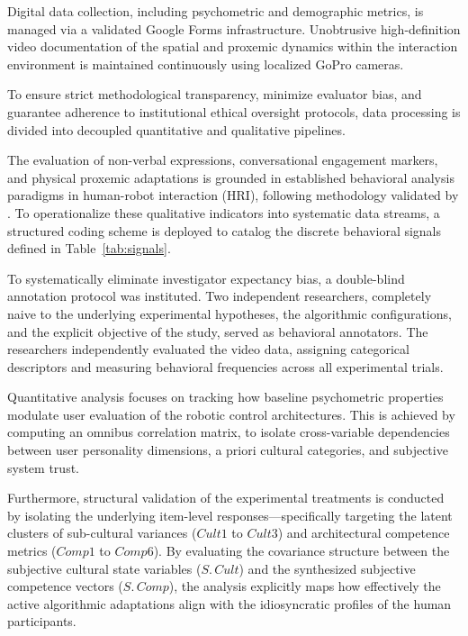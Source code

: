 Digital data collection, including psychometric and demographic metrics, is managed via a validated Google Forms infrastructure. Unobtrusive high-definition video documentation of the spatial and proxemic dynamics within the interaction environment is maintained continuously using localized GoPro cameras.

To ensure strict methodological transparency, minimize evaluator bias, and guarantee adherence to institutional ethical oversight protocols, data processing is divided into decoupled quantitative and qualitative pipelines.

The evaluation of non-verbal expressions, conversational engagement markers, and physical proxemic adaptations is grounded in established behavioral analysis paradigms in human-robot interaction (HRI), following methodology validated by \citep{9515502}. To operationalize these qualitative indicators into systematic data streams, a structured coding scheme is deployed to catalog the discrete behavioral signals defined in Table~\ref{tab:signals}.

To systematically eliminate investigator expectancy bias, a double-blind annotation protocol was instituted. Two independent researchers, completely naive to the underlying experimental hypotheses, the algorithmic configurations, and the explicit objective of the study, served as behavioral annotators. The researchers independently evaluated the video data, assigning categorical descriptors and measuring behavioral frequencies across all experimental trials. 

Quantitative analysis focuses on tracking how baseline psychometric properties modulate user evaluation of the robotic control architectures. This is achieved by computing an omnibus correlation matrix, to isolate cross-variable dependencies between user personality dimensions, a priori cultural categories, and subjective system trust. 

Furthermore, structural validation of the experimental treatments is conducted by isolating the underlying item-level responses—specifically targeting the latent clusters of sub-cultural variances ($\mathit{Cult1}$ to $\mathit{Cult3}$) and architectural competence metrics ($\mathit{Comp1}$ to $\mathit{Comp6}$). By evaluating the covariance structure between the subjective cultural state variables ($\mathit{S.\,Cult}$) and the synthesized subjective competence vectors ($\mathit{S.\,Comp}$), the analysis explicitly maps how effectively the active algorithmic adaptations align with the idiosyncratic profiles of the human participants.